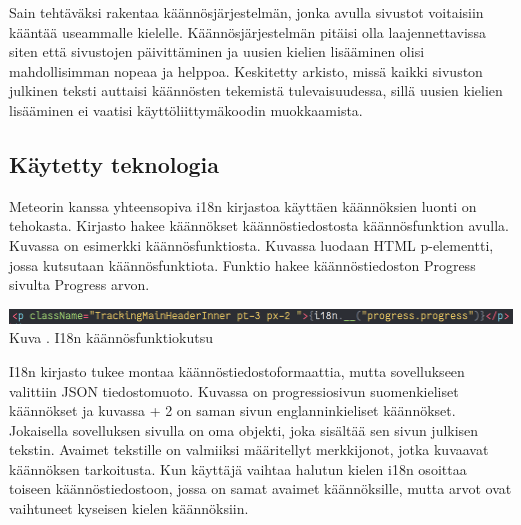 \documentclass[11pt,a4paper,titlepage,oneside]{article}
\begin{document}
Sain tehtäväksi rakentaa käännösjärjestelmän, jonka avulla sivustot voitaisiin kääntää useammalle kielelle.
Käännösjärjestelmän pitäisi olla laajennettavissa siten että sivustojen päivittäminen ja uusien kielien lisääminen 
olisi mahdollisimman nopeaa ja helppoa.
Keskitetty arkisto, missä kaikki sivuston julkinen teksti auttaisi käännösten tekemistä tulevaisuudessa,
sillä uusien kielien lisääminen ei vaatisi käyttöliittymäkoodin muokkaamista.







\subsection{Käytetty teknologia}





Meteorin kanssa yhteensopiva i18n kirjastoa käyttäen käännöksien luonti on tehokasta.
Kirjasto hakee käännökset käännöstiedostosta käännösfunktion avulla.
Kuvassa \nextImageCount{} on esimerkki käännösfunktiosta.
Kuvassa luodaan HTML p-elementti, jossa kutsutaan käännösfunktiota. 
Funktio hakee käännöstiedoston Progress sivulta Progress arvon.\\
\medskip

\bigskip
\includegraphics[width = 15cm]{src/public/oppar/translationcall.png}\\
Kuva \getImgCount. {} I18n käännösfunktiokutsu 
\medskip



I18n kirjasto tukee montaa käännöstiedostoformaattia, mutta sovellukseen valittiin JSON tiedostomuoto.
Kuvassa \nextImageCount{} on progressiosivun suomenkieliset käännökset ja kuvassa {\the\numexpr \theimgCounter + 2 } on saman sivun englanninkieliset käännökset.
Jokaisella sovelluksen sivulla on oma objekti, joka sisältää sen sivun julkisen tekstin. 
Avaimet tekstille on valmiiksi määritellyt merkkijonot, jotka kuvaavat käännöksen tarkoitusta.
Kun käyttäjä vaihtaa halutun kielen i18n osoittaa toiseen käännöstiedostoon, 
jossa on samat avaimet käännöksille, mutta arvot ovat vaihtuneet kyseisen kielen käännöksiin.
\medskip
\end{document}
